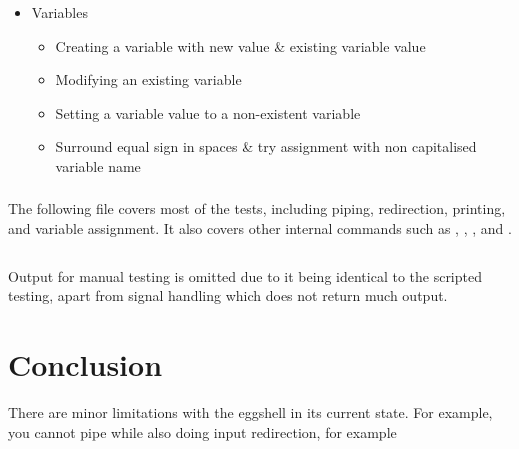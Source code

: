 \documentclass[12pt, a4paper]{report}
\begin{document}
\begin{itemize}
                \item Variables
                    \begin{itemize}
                        \item Creating a variable with new value \& existing variable value
                        \item Modifying an existing variable
                        \item Setting a variable value to a non-existent variable
                        \item Surround equal sign in spaces \& try assignment with non capitalised variable name
                    \end{itemize}
                        
                
                
            \end{itemize}

            \clearpage

            \subsection{}
            \begingroup
                \fontsize{10pt}{10pt}\selectfont
            \endgroup

                The following file covers most of the tests,
                including piping, redirection, printing, and
                variable assignment. It also covers other internal commands
                such as , , , and .

                \clearpage

                \begingroup
                    \fontsize{10pt}{10pt}\selectfont
                    \inputminted[breaklines]{text}{../output.txt}
                \endgroup

                 Output for manual testing is omitted due to
                it being identical to the scripted testing, apart from signal
                handling which does not return much output.

                \clearpage


    \chapter{Conclusion}
        There are minor limitations with the eggshell in its current state.
        For example, you cannot pipe while also doing input redirection, for
        example 
        
\end{document}
